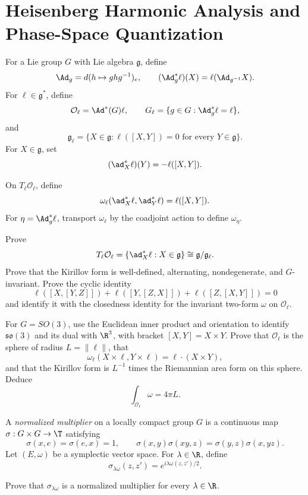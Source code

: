 \section{Heisenberg Harmonic Analysis and Phase-Space Quantization}

\begin{exercise}
For a Lie group $G$ with Lie algebra $\mathfrak g$, define
\[
\Ad_g=d(h\mapsto ghg^{-1})_e,
\qquad
(\Ad_g^*\ell)(X)=\ell(\Ad_{g^{-1}}X).
\]
For $\ell\in\mathfrak g^*$, define
\[
\mathcal O_\ell=\Ad^*(G)\ell,
\qquad
G_\ell=\{g\in G:\Ad_g^*\ell=\ell\},
\]
and
\[
\mathfrak g_\ell
=\{X\in\mathfrak g:\ell([X,Y])=0
\text{ for every }Y\in\mathfrak g\}.
\]
For $X\in\mathfrak g$, set
\[
(\ad_X^*\ell)(Y)=-\ell([X,Y]).
\]

On $T_\ell\mathcal O_\ell$, define
\[
\omega_\ell(\ad_X^*\ell,\ad_Y^*\ell)=\ell([X,Y]).
\]
For $\eta=\Ad_g^*\ell$, transport $\omega_\ell$ by the coadjoint
action to define $\omega_\eta$.

Prove
\[
T_\ell\mathcal O_\ell
=\{\ad_X^*\ell:X\in\mathfrak g\}
\cong\mathfrak g/\mathfrak g_\ell.
\]
Prove that the Kirillov form is well-defined, alternating, nondegenerate,
and $G$-invariant.  Prove the cyclic identity
\[
\ell([X,[Y,Z]])+\ell([Y,[Z,X]])+\ell([Z,[X,Y]])=0
\]
and identify it with the closedness identity for the invariant two-form
$\omega$ on $\mathcal O_\ell$.

For $G=SO(3)$, use the Euclidean inner product and
orientation to identify $\mathfrak{so}(3)$ and its dual with $\R^3$, with
bracket $[X,Y]=X\times Y$.  Prove that $\mathcal O_\ell$ is the sphere of
radius $L=\lVert\ell\rVert$, that
\[
\omega_\ell(X\times\ell,Y\times\ell)
=\ell\mathbin{\cdot}(X\times Y),
\]
and that the Kirillov form is $L^{-1}$ times the Riemannian area form on
this sphere.  Deduce
\[
\int_{\mathcal O_\ell}\omega=4\pi L.
\]
\end{exercise}


\begin{exercise}
A \emph{normalized multiplier} on a locally compact group $G$ is a
continuous map
$\sigma:G\times G\to\T$ satisfying
\[
\sigma(x,e)=\sigma(e,x)=1,
\qquad
\sigma(x,y)\sigma(xy,z)=\sigma(y,z)\sigma(x,yz).
\]
Let $(E,\omega)$ be a symplectic vector space.
For $\lambda\in\R$, define
\[
\sigma_{\lambda\omega}(z,z')=e^{i\lambda\omega(z,z')/2}.
\]

Prove that $\sigma_{\lambda\omega}$ is a normalized multiplier for every
$\lambda\in\R$.
\end{exercise}


